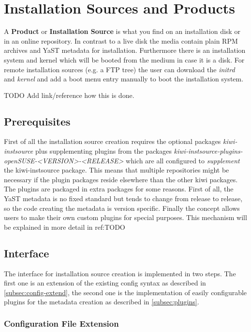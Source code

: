 \chapter{Installation Sources and Products}
\label{chapter:instsrc}
\minitoc

A \textbf{Product} or \textbf{Installation Source} is what you find on an
installation disk or in an online repository. In contrast to a live disk the
media contain plain RPM archives and YaST metadata for installation. Furthermore
there is an installation system and kernel which will be booted from the medium
in case it is a disk. For remote installation sources (e.g. a FTP tree) the user
can download the \textit{initrd} and \textit{kernel} and add a boot menu entry
manually to boot the installation system.

TODO Add link/reference how this is done.


\section{Prerequisites}

First of all the installation source creation requires the optional packages
\textit{kiwi-instsource} plus supplementing plugins from the packages
\textit{kiwi-instsource-plugins-openSUSE-<VERSION>-<RELEASE>}
which are all configured to \textit{supplement} the kiwi-instsource
package. This means that multiple repositories might be necessary if the plugin
packages reside elsewhere than the other kiwi packages. The plugins are packaged
in extra packages for some reasons. First of all, the YaST metadata is no fixed
standard but tends to change from release to release, so the code creating the
metadata is version specific. Finally the concept allows users to make their own
custom plugins for special purposes. This mechanism will be explained in more
detail in ref:TODO


\section{Interface}

The interface for installation source creation is implemented in two steps. The
first one is an extension of the existing config syntax as described in
\vref{subsec:config-extend}, the second one is the implementation of easily
configurable plugins for the metadata creation as described in
\vref{subsec:plugins}.


\subsection{Configuration File Extension}
\label{subsec:config-extend}

